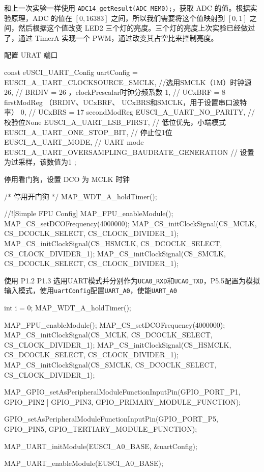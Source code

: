 \documentclass[a4paper,10pt,UTF8]{paper}
\numberwithin{equation}{section}
\numberwithin{figure}{section}
\begin{document}
和上一次实验一样使用 \texttt{ADC14\_getResult(ADC\_MEM0);}，获取 ADC 的值。根据实验原理，ADC 的值在 $[0,16383]$ 之间，所以我们需要将这个值映射到 $[0,1]$ 之间，然后根据这个值改变 LED2 三个灯的亮度。三个灯的亮度上次实验已经做过了，通过 TimerA 实现一个 PWM，通过改变其占空比来控制亮度。


配置 URAT 端口

\begin{ccode}
    const eUSCI_UART_Config uartConfig =
    {
        EUSCI_A_UART_CLOCKSOURCE_SMCLK,               //选用SMCLK（1M）时钟源
        26,                                           // BRDIV = 26 ，clockPrescalar时钟分频系数
        1,                                            // UCxBRF = 8  firstModReg （BRDIV、UCxBRF、 UCxBRS和SMCLK，用于设置串口波特率）
        0,                                            // UCxBRS = 17 secondModReg
        EUSCI_A_UART_NO_PARITY,                       // 校验位None
        EUSCI_A_UART_LSB_FIRST,                       // 低位优先，小端模式
        EUSCI_A_UART_ONE_STOP_BIT,                    // 停止位1位
        EUSCI_A_UART_MODE,                            // UART mode
        EUSCI_A_UART_OVERSAMPLING_BAUDRATE_GENERATION // 设置为过采样，该数值为1
    };
\end{ccode}

停用看门狗，设置 DCO 为 MCLK 时钟

\begin{ccode}
    /* 停用开门狗 */
    MAP_WDT_A_holdTimer();

    //![Simple FPU Config]
    MAP_FPU_enableModule();  
    MAP_CS_setDCOFrequency(4000000); 
    MAP_CS_initClockSignal(CS_MCLK, CS_DCOCLK_SELECT, CS_CLOCK_DIVIDER_1); 
    MAP_CS_initClockSignal(CS_HSMCLK, CS_DCOCLK_SELECT, CS_CLOCK_DIVIDER_1);
    MAP_CS_initClockSignal(CS_SMCLK, CS_DCOCLK_SELECT, CS_CLOCK_DIVIDER_1);
\end{ccode}

使用 P1.2 P1.3 选用UART模式并分别作为\texttt{UCA0\_RXD}和\texttt{UCA0\_TXD}，P5.5配置为模拟输入模式，使用\texttt{uartConfig}配置\texttt{UART\_A0}，使能\texttt{UART\_A0}

\begin{ccode}
    int i = 0;
    MAP_WDT_A_holdTimer();

    MAP_FPU_enableModule();   
    MAP_CS_setDCOFrequency(4000000);    
    MAP_CS_initClockSignal(CS_MCLK, CS_DCOCLK_SELECT, CS_CLOCK_DIVIDER_1);  
    MAP_CS_initClockSignal(CS_HSMCLK, CS_DCOCLK_SELECT, CS_CLOCK_DIVIDER_1); 
    MAP_CS_initClockSignal(CS_SMCLK, CS_DCOCLK_SELECT, CS_CLOCK_DIVIDER_1);  

    MAP_GPIO_setAsPeripheralModuleFunctionInputPin(GPIO_PORT_P1, GPIO_PIN2 | GPIO_PIN3, GPIO_PRIMARY_MODULE_FUNCTION);

    GPIO_setAsPeripheralModuleFunctionInputPin(GPIO_PORT_P5, GPIO_PIN5, GPIO_TERTIARY_MODULE_FUNCTION);

    MAP_UART_initModule(EUSCI_A0_BASE, &uartConfig);

    MAP_UART_enableModule(EUSCI_A0_BASE);
\end{ccode}
\end{document}
